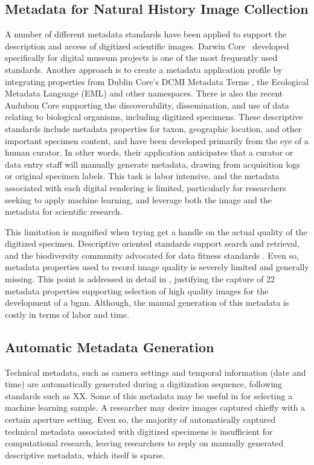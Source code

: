 \documentclass[conference]{IEEEtran}
\begin{document}
\subsection{Metadata for Natural History Image Collection}
A number of different metadata standards have been applied to support the description and access of digitized scientific images. Darwin Core~\cite{biodiv_info_standards} developed specifically for digital museum projects is one of the most frequently used standards. Another approach is to create a metadata application profile by integrating properties from Dublin Core's DCMI Metadata Terms \cite{dc_terms}, the Ecological Metadata Language (EML) \cite{EML_2019} and other namespaces. There is also the recent Audubon Core supporting the discoverability, dissemination, and use of data relating to biological organisms, including digitized specimens.\cite{audub_core} These descriptive standards include metadata properties for taxon, geographic location, and other important specimen content, and have been developed primarily from the eye of a human curator. In other words, their application anticipates that a curator or data entry staff will manually generate metadata, drawing from acquisition logs or original specimen labels. This task is labor intensive, and the metadata associated with each digital rendering is limited, particularly for researchers seeking to apply machine learning, and leverage both the image and the metadata for scientific research.

This limitation is magnified when trying get a handle on the actual quality of the digitized specimen. Descriptive oriented standards support search and retrieval, and the biodiversity community advocated for data fitness standards \cite{chapman2020developing}. Even so, metadata properties used to record image quality is severely limited and generally missing. This point is addressed in detail in \cite{leipzig2021biodiversity}, justifying the capture of 22 metadata properties supporting selection of high quality images for the development of a bgnn. Although, the manual generation of this metadata is costly in terms of labor and time.


\subsection{Automatic Metadata Generation}
Technical metadata, such as camera settings and temporal information (date and time) are automatically generated during a digitization sequence, following standards such as XX. Some of this metadata may be useful in for selecting a machine learning sample. A researcher may desire images captured chiefly with a certain aperture setting. Even so, the majority of automatically captured technical metadata associated with digitized specimens is insufficient for computational research, leaving researchers to reply on manually generated descriptive metadata, which itself is sparse.
\end{document}

